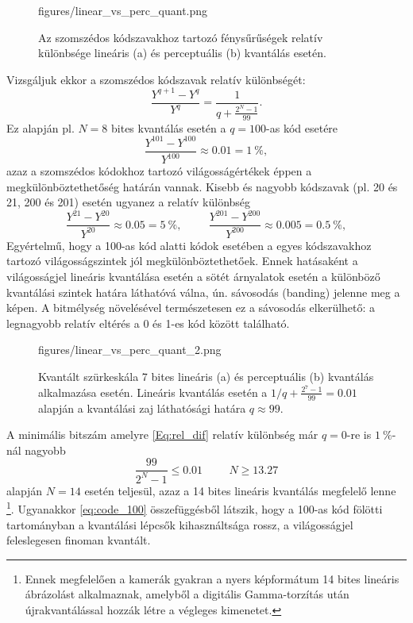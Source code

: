 \begin{figure}[]
	\centering
	\begin{overpic}[width = 1\columnwidth ]{figures/linear_vs_perc_quant.png}
	\end{overpic}
	\caption{Az szomszédos kódszavakhoz tartozó fénysűrűségek relatív különbsége lineáris (a) és perceptuális (b) kvantálás esetén.}
	\label{Fig:linear_vs_perc_quant}
\end{figure}

Vizsgáljuk ekkor a szomszédos kódszavak relatív különbségét:
\begin{equation}
\frac{Y^{q+1}-Y^q}{Y^q} = \frac{1 }{q + \frac{2^N - 1}{99}}.
\label{Eq:rel_dif}
\end{equation}
Ez alapján pl. $N = 8$  bites kvantálás esetén a $q = 100$-as kód esetére
\begin{equation*}
\frac{Y^{101}-Y^{100}}{Y^{100}} \approx 0.01 = 1~\%,
\end{equation*}
azaz a szomszédos kódokhoz tartozó világosságértékek éppen a megkülönböztethetőség határán vannak.
Kisebb és nagyobb kódszavak (pl. 20 és 21, 200 és 201) esetén ugyanez a relatív különbség
\begin{equation*}
\frac{Y^{21}-Y^{20}}{Y^{20}} \approx 0.05 = 5~\%, \hspace{1cm} \frac{Y^{201}-Y^{200}}{Y^{200}} \approx 0.005 = 0.5~\%,
\label{eq:code_100}
\end{equation*}
Egyértelmű, hogy a 100-as kód alatti kódok esetében a egyes kódszavakhoz tartozó világosságszintek jól megkülönböztethetőek.
Ennek hatásaként a világosságjel lineáris kvantálása esetén a sötét árnyalatok esetén a különböző kvantálási szintek határa láthatóvá válna, ún. sávosodás (banding) jelenne meg a képen.
A bitmélység növelésével természetesen ez a sávosodás elkerülhető:
a legnagyobb relatív eltérés a 0 és 1-es kód között található. 
%
\begin{figure}[]
	\centering
	\begin{overpic}[width = 0.8\columnwidth ]{figures/linear_vs_perc_quant_2.png}
	\end{overpic}
	\caption{Kvantált szürkeskála 7 bites lineáris (a) és perceptuális (b) kvantálás alkalmazása esetén.
	Lineáris kvantálás esetén a $1 / q + \frac{2^7 - 1}{99} = 0.01$ alapján a kvantálási zaj láthatósági határa $q \approx 99$.}
	\label{Fig:linear_vs_perc_quant_2}
\end{figure}
%
A minimális bitszám amelyre \eqref{Eq:rel_dif} relatív különbség már $q=0$-re is $1~\%$-nál nagyobb
\begin{equation}
\frac{99}{2^N - 1} \leq 0.01 \hspace{1cm} N \geq 13.27 
\end{equation}
alapján $N=14$ esetén teljesül, azaz a 14 bites lineáris kvantálás megfelelő lenne \footnote{Ennek megfelelően a kamerák gyakran a nyers képformátum 14 bites lineáris ábrázolást alkalmaznak, amelyből a digitális Gamma-torzítás után újrakvantálással hozzák létre a végleges kimenetet.}.
Ugyanakkor \eqref{eq:code_100} összefüggésből látszik, hogy a 100-as kód fölötti tartományban a kvantálási lépcsők kihasználtsága rossz, a világosságjel feleslegesen finoman kvantált.


